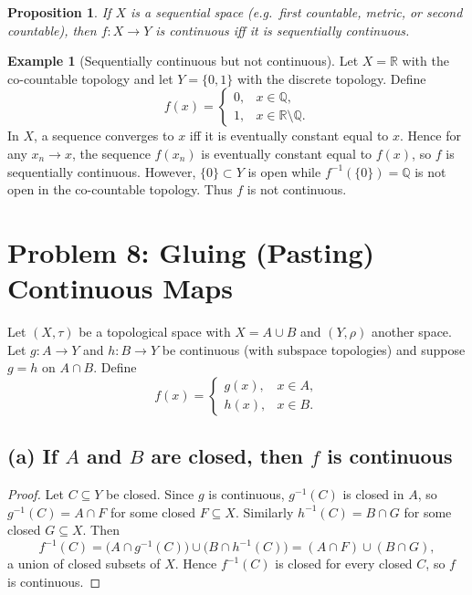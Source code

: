 \documentclass[12pt,a4paper]{article}
\theoremstyle{plain}
\newtheorem{proposition}[theorem]{Proposition}
\theoremstyle{definition}
\newtheorem{example}[theorem]{Example}
\theoremstyle{remark}
\theoremstyle{remark}
\begin{document}
	\begin{proposition}
		If $X$ is a sequential space (e.g.\ first countable, metric, or second countable), then $f:X\to Y$ is continuous iff it is sequentially continuous.
	\end{proposition}
	
	\begin{example}[Sequentially continuous but not continuous]
		Let $X=\mathbb{R}$ with the co-countable topology and let $Y=\{0,1\}$ with the discrete topology. Define
		\[
		f(x)=\begin{cases}
			0,& x\in \mathbb{Q},\\
			1,& x\in \mathbb{R}\setminus \mathbb{Q}.
		\end{cases}
		\]
		In $X$, a sequence converges to $x$ iff it is eventually constant equal to $x$. Hence for any $x_n\to x$,
		the sequence $f(x_n)$ is eventually constant equal to $f(x)$, so $f$ is sequentially continuous.
		However, $\{0\}\subset Y$ is open while $f^{-1}(\{0\})=\mathbb{Q}$ is not open in the co-countable topology.
		Thus $f$ is not continuous.
	\end{example}
	
	\section*{Problem 8: Gluing (Pasting) Continuous Maps}
	
	Let $(X,\tau)$ be a topological space with $X=A\cup B$ and $(Y,\rho)$ another space.
	Let $g:A\to Y$ and $h:B\to Y$ be continuous (with subspace topologies) and suppose $g=h$ on $A\cap B$.
	Define
	\[
	f(x)=
	\begin{cases}
		g(x),& x\in A,\\
		h(x),& x\in B.
	\end{cases}
	\]
	
	\subsection*{(a) If $A$ and $B$ are closed, then $f$ is continuous}
	\begin{proof}
		Let $C\subseteq Y$ be closed. Since $g$ is continuous, $g^{-1}(C)$ is closed in $A$, so $g^{-1}(C)=A\cap F$ for some closed $F\subseteq X$.
		Similarly $h^{-1}(C)=B\cap G$ for some closed $G\subseteq X$.
		Then
		\[
		f^{-1}(C)=\big(A\cap g^{-1}(C)\big)\cup\big(B\cap h^{-1}(C)\big)=(A\cap F)\cup(B\cap G),
		\]
		a union of closed subsets of $X$. Hence $f^{-1}(C)$ is closed for every closed $C$, so $f$ is continuous.
	\end{proof}
	
\end{document}
